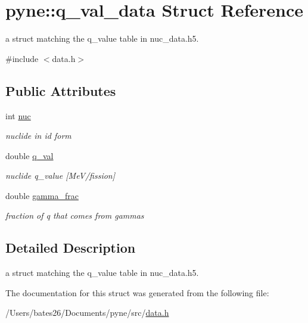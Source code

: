 \hypertarget{structpyne_1_1q__val__data}{\section{pyne\+:\+:q\+\_\+val\+\_\+data Struct Reference}
\label{structpyne_1_1q__val__data}
}


a struct matching the q\+\_\+value table in nuc\+\_\+data.\+h5.  




{\ttfamily \#include $<$data.\+h$>$}

\subsection*{Public Attributes}
\begin{DoxyCompactItemize}
\item 
\hypertarget{structpyne_1_1q__val__data_a39dbf1ad0347f0f68f09c94a9ff9157f}{int \hyperlink{structpyne_1_1q__val__data_a39dbf1ad0347f0f68f09c94a9ff9157f}{nuc}}\label{structpyne_1_1q__val__data_a39dbf1ad0347f0f68f09c94a9ff9157f}

\begin{DoxyCompactList}\small\item\em nuclide in id form \end{DoxyCompactList}\item 
\hypertarget{structpyne_1_1q__val__data_a8016ec428535fddb8cba5005511d4a8a}{double \hyperlink{structpyne_1_1q__val__data_a8016ec428535fddb8cba5005511d4a8a}{q\+\_\+val}}\label{structpyne_1_1q__val__data_a8016ec428535fddb8cba5005511d4a8a}

\begin{DoxyCompactList}\small\item\em nuclide q\+\_\+value \mbox{[}Me\+V/fission\mbox{]} \end{DoxyCompactList}\item 
\hypertarget{structpyne_1_1q__val__data_a5d47c172a924715d567a1b6119e20830}{double \hyperlink{structpyne_1_1q__val__data_a5d47c172a924715d567a1b6119e20830}{gamma\+\_\+frac}}\label{structpyne_1_1q__val__data_a5d47c172a924715d567a1b6119e20830}

\begin{DoxyCompactList}\small\item\em fraction of q that comes from gammas \end{DoxyCompactList}\end{DoxyCompactItemize}


\subsection{Detailed Description}
a struct matching the q\+\_\+value table in nuc\+\_\+data.\+h5. 

The documentation for this struct was generated from the following file\+:\begin{DoxyCompactItemize}
\item 
/\+Users/bates26/\+Documents/pyne/src/\hyperlink{data_8h}{data.\+h}\end{DoxyCompactItemize}
